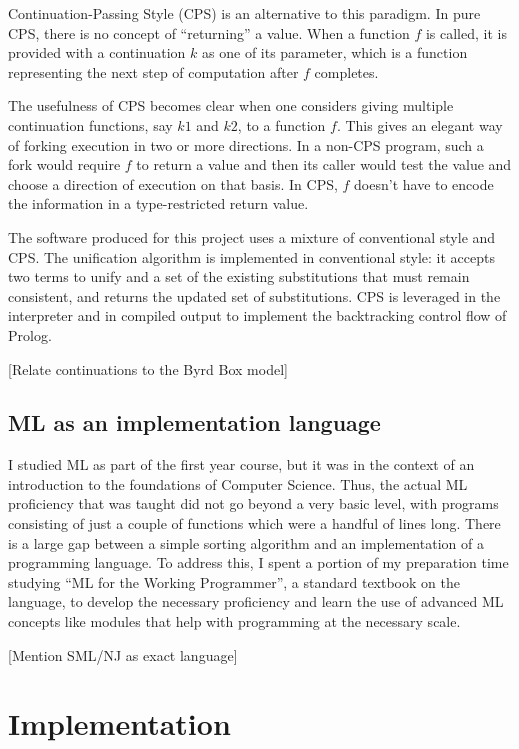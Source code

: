 \documentclass[12pt]{article}
\begin{document}
Continuation-Passing Style (CPS) is an alternative to this paradigm. 
In pure CPS, there is no concept of ``returning'' a value. 
When a function $f$ is called, it is provided with a continuation $k$ as one of its parameter, which is a function representing the next step of computation after $f$ completes. 

The usefulness of CPS becomes clear when one considers giving multiple continuation functions, say $k1$ and $k2$, to a function $f$. 
This gives an elegant way of forking execution in two or more directions. 
In a non-CPS program, such a fork would require $f$ to return a value and then its caller would test the value and choose a direction of execution on that basis. 
In CPS, $f$ doesn't have to encode the information in a type-restricted return value.

The software produced for this project uses a mixture of conventional style and CPS. 
The unification algorithm is implemented in conventional style: it accepts two terms to unify and a set of the existing substitutions that must remain consistent, and returns the updated set of substitutions. 
CPS is leveraged in the interpreter and in compiled output to implement the backtracking control flow of Prolog.

[Relate continuations to the Byrd Box model]


\subsection{ML as an implementation language}

I studied ML as part of the first year course, but it was in the context of an introduction to the foundations of Computer Science. 
Thus, the actual ML proficiency that was taught did not go beyond a very basic level, with programs consisting of just a couple of functions which were a handful of lines long. 
There is a large gap between a simple sorting algorithm and an implementation of a programming language. 
To address this, I spent a portion of my preparation time studying ``ML for the Working Programmer'', a standard textbook on the language, to develop the necessary proficiency and learn the use of advanced ML concepts like modules that help with programming at the necessary scale.

[Mention SML/NJ as exact language]

\newpage

\section{Implementation}
\end{document}
